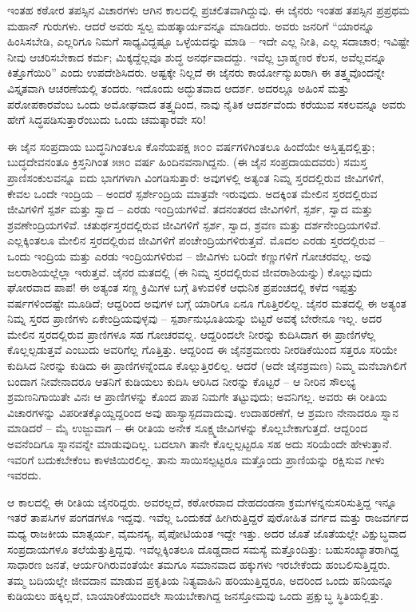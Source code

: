 ಇಂತಹ ಕಠೋರ ತಪಸ್ಸಿನ ವಿಚಾರಗಳು ಆಗಿನ ಕಾಲದಲ್ಲಿ ಪ್ರಚಲಿತವಾಗಿದ್ದುವು. ಈ ಜೈನರು ಇಂತಹ ತಪಸ್ಸಿನ ಪ್ರಪ್ರಥಮ ಮಹಾನ್ ಗುರುಗಳು. ಆದರೆ ಅವರು ಸ್ವಲ್ಪ ಮಹತ್ಕಾರ್ಯವನ್ನೂ ಮಾಡಿದರು. ಅವರು ಜನರಿಗೆ “ಯಾರನ್ನೂ ಹಿಂಸಿಸಬೇಡಿ, ಎಲ್ಲರಿಗೂ ನಿಮಗೆ ಸಾಧ್ಯವಿದ್ದಷ್ಟೂ ಒಳ್ಳೆಯದನ್ನು ಮಾಡಿ – ಇದೇ ಎಲ್ಲ ನೀತಿ, ಎಲ್ಲ ಸದಾಚಾರ; ಇವಿಷ್ಟೇ ನೀವು ಆಚರಿಸಬೇಕಾದ ಕರ್ಮ; ಮಿಕ್ಕದ್ದೆಲ್ಲವೂ ಶುದ್ಧ ಅನರ್ಥವಾದದ್ದು. ಇವೆಲ್ಲ ಬ್ರಾಹ್ಮಣರ ಕೆಲಸ, ಅವೆಲ್ಲವನ್ನೂ ಕಿತ್ತೊಗೆಯಿರಿ” ಎಂದು ಉಪದೇಶಿಸಿದರು. ಅಷ್ಟಕ್ಕೇ ನಿಲ್ಲದೆ ಈ ಜೈನರು ಕಾರ್ಯೋನ್ಮುಖರಾಗಿ ಈ ತತ್ತ್ವವೊಂದನ್ನೇ ವಿಸ್ತೃತವಾಗಿ ಆಚರಣೆಯಲ್ಲಿ ತಂದರು. ಇದೊಂದು ಅದ್ಭುತವಾದ ಆದರ್ಶ. ಅದರಲ್ಲೂ ಅಹಿಂಸೆ ಮತ್ತು ಪರೋಪಕಾರವೆಂಬ ಒಂದು ಅಮೋಘವಾದ ತತ್ತ್ವದಿಂದ, ನಾವು ನೈತಿಕ ಆದರ್ಶವೆಂದು ಕರೆಯುವ ಸಕಲವನ್ನೂ ಅವರು ಹೇಗೆ ಸಿದ್ಧಪಡಿಸುತ್ತಾರೆಂಬುದು ಒಂದು ಚಮತ್ಕಾರವೇ ಸರಿ!

ಈ ಜೈನ ಸಂಪ್ರದಾಯ ಬುದ್ಧನಿಗಿಂತಲೂ ಕೊನೆಯಪಕ್ಷ ೫೦೦ ವರ್ಷಗಳಿಗಿಂತಲೂ ಹಿಂದೆಯೇ ಅಸ್ತಿತ್ವದಲ್ಲಿತ್ತು; ಬುದ್ಧದೇವನಂತೂ ಕ್ರಿಸ್ತನಿಗಿಂತ ೫೫೦ ವರ್ಷ ಹಿಂದಿನವನಾಗಿದ್ದನು. (ಈ ಜೈನ ಸಂಪ್ರದಾಯದವರು) ಸಮಸ್ತ ಪ್ರಾಣಿಸಂಕುಲವನ್ನೂ ಐದು ಭಾಗಗಳಾಗಿ ವಿಂಗಡಿಸುತ್ತಾರೆ: ಅವುಗಳಲ್ಲಿ ಅತ್ಯಂತ ನಿಮ್ನ ಸ್ತರದಲ್ಲಿರುವ ಜೀವಿಗಳಿಗೆ, ಕೇವಲ ಒಂದೇ ಇಂದ್ರಿಯ – ಅಂದರೆ ಸ್ಪರ್ಶೇಂದ್ರಿಯ ಮಾತ್ರವೇ ಇರುವುದು. ಅದಕ್ಕಿಂತ ಮೇಲಿನ ಸ್ತರದಲ್ಲಿರುವ ಜೀವಿಗಳಿಗೆ ಸ್ಪರ್ಶ ಮತ್ತು ಸ್ವಾದ – ಎರಡು ಇಂದ್ರಿಯಗಳಿವೆ. ತದನಂತರದ ಜೀವಿಗಳಿಗೆ, ಸ್ಪರ್ಶ, ಸ್ವಾದ ಮತ್ತು ಶ್ರವಣೇಂದ್ರಿಯಗಳಿವೆ. ಚತುರ್ಥಸ್ತರದಲ್ಲಿರುವ ಜೀವಿಗಳಿಗೆ ಸ್ಪರ್ಶ, ಸ್ವಾದ, ಶ್ರವಣ ಮತ್ತು ದರ್ಶನೇಂದ್ರಿಯಗಳಿವೆ. ಎಲ್ಲಕ್ಕಿಂತಲೂ ಮೇಲಿನ ಸ್ತರದಲ್ಲಿರುವ ಜೀವಿಗಳಿಗೆ ಪಂಚೇಂದ್ರಿಯಗಳಿರುತ್ತವೆ. ಮೊದಲ ಎರಡು ಸ್ತರದಲ್ಲಿರುವ – ಒಂದು ಇಂದ್ರಿಯ ಮತ್ತು ಎರಡು ಇಂದ್ರಿಯಗಳಿರುವ – ಜೀವಿಗಳು ಬರಿದೇ ಕಣ್ಣುಗಳಿಗೆ ಗೋಚರವಲ್ಲ. ಅವು ಜಲರಾಶಿಯಲ್ಲೆಲ್ಲಾ ಇರುತ್ತವೆ. ಜೈನರ ಮತದಲ್ಲಿ (ಈ ನಿಮ್ನ ಸ್ತರದಲ್ಲಿರುವ ಜೀವರಾಶಿಯನ್ನು) ಕೊಲ್ಲುವುದು ಘೋರವಾದ ಪಾಪ! ಈ ಅತ್ಯಂತ ಸಣ್ಣ ಕ್ರಿಮಿಗಳ ಬಗ್ಗೆ ತಿಳುವಳಿಕೆ ಆಧುನಿಕ ಪ್ರಪಂಚದಲ್ಲಿ ಕಳೆದ ಇಪ್ಪತ್ತು ವರ್ಷಗಳಿಂದಷ್ಟೇ ಮೂಡಿದೆ; ಆದ್ದರಿಂದ ಅವುಗಳ ಬಗ್ಗೆ ಯಾರಿಗೂ ಏನೂ ಗೊತ್ತಿರಲಿಲ್ಲ. ಜೈನರ ಮತದಲ್ಲಿ ಈ ಅತ್ಯಂತ ನಿಮ್ನ ಸ್ತರದ ಪ್ರಾಣಿಗಳು ಏಕೇಂದ್ರಿಯವುಳ್ಳವು – ಸ್ಪರ್ಶಾನುಭೂತಿಯನ್ನು ಬಿಟ್ಟರೆ ಅವಕ್ಕೆ ಬೇರೇನೂ ಇಲ್ಲ. ಅದರ ಮೇಲಿನ ಸ್ತರದಲ್ಲಿರುವ ಪ್ರಾಣಿಗಳೂ ಸಹ ಗೋಚರವಲ್ಲ. ಆದ್ದರಿಂದಲೇ ನೀರನ್ನು ಕುದಿಸಿದಾಗ ಈ ಪ್ರಾಣಿಗಳೆಲ್ಲ ಕೊಲ್ಲಲ್ಪಡುತ್ತವೆ ಎಂಬುದು ಅವರಿಗೆಲ್ಲ ಗೊತ್ತಿತ್ತು. ಆದ್ದರಿಂದ ಈ ಜೈನಶ್ರಮಣರು ನೀರಡಿಕೆಯಿಂದ ಸತ್ತರೂ ಸರಿಯೇ ಕುದಿಸಿದ ನೀರನ್ನು ಕುಡಿದು ಈ ಪ್ರಾಣಿಗಳನ್ನೆಂದೂ ಕೊಲ್ಲುತ್ತಿರಲಿಲ್ಲ. ಆದರೆ (ಅದೇ ಜೈನಶ್ರಮಣ) ನಿಮ್ಮ ಮನೆಬಾಗಿಲಿಗೆ ಬಂದಾಗ ನೀವೇನಾದರೂ ಆತನಿಗೆ ಕುಡಿಯಲು ಕುದಿಸಿ ಆರಿಸಿದ ನೀರನ್ನು ಕೊಟ್ಟರೆ – ಆ ನೀರಿನ ಸೌಲಭ್ಯ ಶ್ರಮಣನಿಗಾಯಿತೇ ವಿನಃ ಆ ಪ್ರಾಣಿಗಳನ್ನು ಕೊಂದ ಪಾಪ ನಿಮಗೇ ತಟ್ಟುವುದು; ಅವನಿಗಲ್ಲ. ಅವರು ಈ ರೀತಿಯ ವಿಚಾರಗಳನ್ನು ವಿಪರೀತಕ್ಕೊಯ್ದದ್ದರಿಂದ ಅವು ಹಾಸ್ಯಾಸ್ಪದವಾದುವು. ಉದಾಹರಣೆಗೆ, ಆ ಶ್ರಮಣ ನೇನಾದರೂ ಸ್ನಾನ ಮಾಡಿದರೆ – ಮೈ ಉಜ್ಜುವಾಗ – ಈ ರೀತಿಯ ಅನೇಕ ಸೂಕ್ಷ್ಮಜೀವಿಗಳನ್ನು ಕೊಲ್ಲಬೇಕಾಗುತ್ತದೆ. ಆದ್ದರಿಂದ ಅವನೆಂದಿಗೂ ಸ್ನಾನವನ್ನೇ ಮಾಡುವುದಿಲ್ಲ. ಬದಲಾಗಿ ತಾನೇ ಕೊಲ್ಲಲ್ಪಟ್ಟರೂ ಸಹ ಅದು ಸರಿಯೆಂದೇ ಹೇಳುತ್ತಾನೆ. ಇವರಿಗೆ ಬದುಕಬೇಕೆಂಬ ಕಾಳಜಿಯಿರಲಿಲ್ಲ. ತಾನು ಸಾಯಿಸಲ್ಪಟ್ಟರೂ ಮತ್ತೊಂದು ಪ್ರಾಣಿಯನ್ನು ರಕ್ಷಿಸುವ ಗೀಳು ಇವರದು.

ಆ ಕಾಲದಲ್ಲಿ ಈ ರೀತಿಯ ಜೈನರಿದ್ದರು. ಅವರಲ್ಲದೆ, ಕಠೋರವಾದ ದೇಹದಂಡನಾ ಕ್ರಮಗಳನ್ನನುಸರಿಸುತ್ತಿದ್ದ ಇನ್ನೂ ಇತರೆ ತಾಪಸಿಗಳ ಪಂಗಡಗಳೂ ಇದ್ದವು. ಇವೆಲ್ಲ ಒಂದುಕಡೆ ಹೀಗಿರುತ್ತಿದ್ದರೆ ಪುರೋಹಿತ ವರ್ಗದ ಮತ್ತು ರಾಜವರ್ಗದ ಮಧ್ಯ ರಾಜಕೀಯ ಮಾತ್ಸರ್ಯ, ವೈಮನಸ್ಯ, ಪೈಪೋಟಿಯಂತ ಇದ್ದೇ ಇತ್ತು. ಅದರ ಜೊತೆ ಜೊತೆಯಲ್ಲೇ ವಿಕ್ಷುಬ್ಧವಾದ ಸಂಪ್ರದಾಯಗಳೂ ತಲೆಯೆತ್ತುತ್ತಿದ್ದವು. ಇವೆಲ್ಲಕ್ಕಿಂತಲೂ ದೊಡ್ಡದಾದ ಸಮಸ್ಯೆ ಮತ್ತೊಂದಿತ್ತು: ಬಹುಸಂಖ್ಯಾತರಾಗಿದ್ದ ಸಾಧಾರಣ ಜನತೆ, ಆರ್ಯರಿಗಿರುವಂತೆಯೇ ತಮಗೂ ಸಮಾನವಾದ ಹಕ್ಕುಗಳು ಇರಬೇಕೆಂದು ಹಂಬಲಿಸುತ್ತಿದ್ದರು. ತಮ್ಮ ಬದಿಯಲ್ಲೇ ಜೀವದಾನ ಮಾಡುವ ಪ್ರಕೃತಿಯ ನಿತ್ಯವಾಹಿನಿ ಹರಿಯುತ್ತಿದ್ದರೂ, ಅದರಿಂದ ಒಂದು ಹನಿಯನ್ನೂ ಕುಡಿಯಲು ಹಕ್ಕಿಲ್ಲದೆ, ಬಾಯಾರಿಕೆಯಿಂದಲೇ ಸಾಯಬೇಕಾಗಿದ್ದ ಜನಸ್ತೋಮವು ಒಂದು ಪ್ರಕ್ಷುಬ್ಧ ಸ್ಥಿತಿಯಲ್ಲಿತ್ತು.

